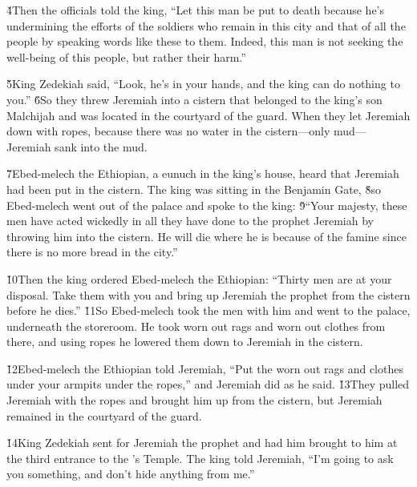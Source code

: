 \v{4}Then the officials told the king, ``Let this man be put to death because he's undermining the efforts of the soldiers who remain in this city and that of all the people by speaking words like these to them. Indeed, this man is not seeking the well-being of this people, but rather their harm.''

\v{5}King Zedekiah said, ``Look, he's in your hands, and the king can do nothing to you.'' \v{6}So they threw Jeremiah into a cistern that belonged to the king's son Malchijah and was located in the courtyard of the guard. When they let Jeremiah down with ropes, because there was no water in the cistern---only mud---Jeremiah sank into the mud.

\v{7}Ebed-melech the Ethiopian, a eunuch in the king's house, heard that Jeremiah had been put in the cistern. The king was sitting in the Benjamin Gate, \v{8}so Ebed-melech went out of the palace and spoke to the king: \v{9}``Your majesty, these men have acted wickedly in all they have done to the prophet Jeremiah by throwing him into the cistern. He will die where he is because of the famine since there is no more bread in the city.''

\v{10}Then the king ordered Ebed-melech the Ethiopian: ``Thirty men are at your disposal. Take them with you and bring up Jeremiah the prophet from the cistern before he dies.'' \v{11}So Ebed-melech took the men with him and went to the palace, underneath the storeroom. He took worn out rags and worn out clothes from there, and using ropes he lowered them down to Jeremiah in the cistern.

\v{12}Ebed-melech the Ethiopian told Jeremiah, ``Put the worn out rags and clothes under your armpits under the ropes,'' and Jeremiah did as he said. \v{13}They pulled Jeremiah with the ropes and brought him up from the cistern, but Jeremiah remained in the courtyard of the guard.

\v{14}King Zedekiah sent for Jeremiah the prophet and had him brought to him at the third entrance to the 's Temple. The king told Jeremiah, ``I'm going to ask you something, and don't hide anything from me.''

